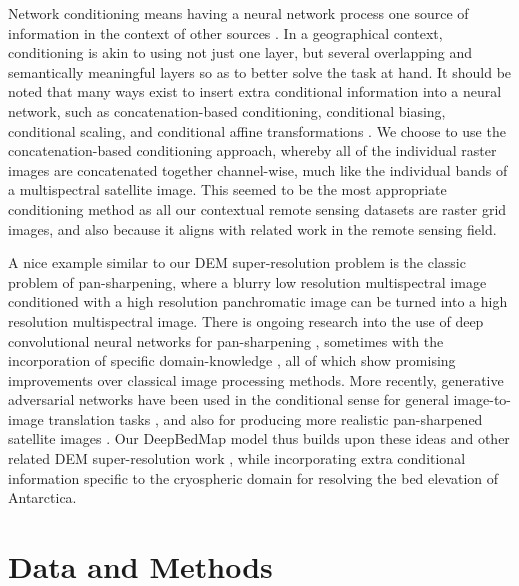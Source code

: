 \documentclass[tc, manuscript]{copernicus}
\begin{document}
Network conditioning means having a neural network process one source of information in the context of other sources \citep{DumoulinFeaturewisetransformations2018}.
In a geographical context, conditioning is akin to using not just one layer, but several overlapping and semantically meaningful layers so as to better solve the task at hand.
It should be noted that many ways exist to insert extra conditional information into a neural network, such as concatenation-based conditioning, conditional biasing, conditional scaling, and conditional affine transformations \citep{DumoulinFeaturewisetransformations2018}.
We choose to use the concatenation-based conditioning approach, whereby all of the individual raster images are concatenated together channel-wise, much like the individual bands of a multispectral satellite image.
This seemed to be the most appropriate conditioning method as all our contextual remote sensing datasets are raster grid images, and also because it aligns with related work in the remote sensing field.

A nice example similar to our DEM super-resolution problem is the classic problem of pan-sharpening, where a blurry low resolution multispectral image conditioned with a high resolution panchromatic image can be turned into a high resolution multispectral image.
There is ongoing research into the use of deep convolutional neural networks for pan-sharpening \citep{MasiPansharpeningConvolutionalNeural2016,ScarpaTargetAdaptiveCNNBasedPansharpening2018}, sometimes with the incorporation of specific domain-knowledge \citep{YangPanNetDeepNetwork2017}, all of which show promising improvements over classical image processing methods.
More recently, generative adversarial networks \citep{GoodfellowGenerativeAdversarialNetworks2014} have been used in the conditional sense for general image-to-image translation tasks \citep[e.g.][]{IsolaImagetoImageTranslationConditional2016,ParkSemanticImageSynthesis2019}, and also for producing more realistic pan-sharpened satellite images \citep{LiuPSGANGenerativeAdversarial2018}.
Our DeepBedMap model thus builds upon these ideas and other related DEM super-resolution work \citep{XuNonlocalsimilaritybased2015,ChenConvolutionalNeuralNetwork2016}, while incorporating extra conditional information specific to the cryospheric domain for resolving the bed elevation of Antarctica.


\section{Data and Methods}
\end{document}
